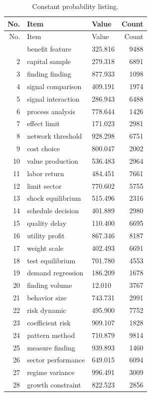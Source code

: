 \documentclass[11pt]{report}
\begin{document}
\begin{longtable}{rllr}\caption{Constant probability listing.}\label{tab:l2}\\\toprule No. & Item & Value & Count \\ \midrule \endfirsthead\toprule No. & Item & Value & Count \\ \midrule \endhead\bottomrule \endfoot
1 & benefit feature & 325.816 & 9488 \\
2 & capital sample & 279.318 & 6891 \\
3 & finding finding & 877.933 & 1098 \\
4 & signal comparison & 409.191 & 1974 \\
5 & signal interaction & 286.943 & 6488 \\
6 & process analysis & 778.644 & 1426 \\
7 & effect limit & 171.023 & 2981 \\
8 & network threshold & 928.298 & 6751 \\
9 & cost choice & 800.047 & 2002 \\
10 & value production & 536.483 & 2964 \\
11 & labor return & 484.451 & 7661 \\
12 & limit sector & 770.602 & 5755 \\
13 & shock equilibrium & 515.496 & 2316 \\
14 & schedule decision & 401.889 & 2980 \\
15 & quality delay & 110.400 & 6695 \\
16 & utility profit & 867.346 & 8187 \\
17 & weight scale & 402.493 & 6691 \\
18 & test equilibrium & 701.780 & 4553 \\
19 & demand regression & 186.209 & 1678 \\
20 & finding volume & 12.010 & 3767 \\
21 & behavior size & 743.731 & 2991 \\
22 & risk dynamic & 495.900 & 7752 \\
23 & coefficient risk & 909.107 & 1828 \\
24 & pattern method & 710.879 & 9814 \\
25 & measure finding & 939.893 & 1460 \\
26 & sector performance & 649.015 & 6094 \\
27 & regime variance & 996.491 & 3009 \\
28 & growth constraint & 822.523 & 2856 \\

\end{longtable}
\end{document}
